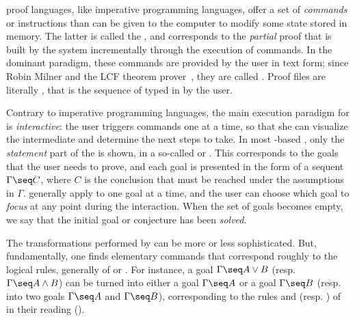 \begin{description}[labelsep=0pt]
  proof languages, like imperative programming languages,
  offer a set of \emph{commands} or instructions than can be given to the
  computer to modify some state stored in memory. The latter is called the
  , and corresponds to the \emph{partial} proof that is built
  by the system incrementally through the execution of commands. In the dominant
  paradigm, these commands are provided by the user in text form; since Robin
  Milner and the LCF theorem prover~, they
  are called . Proof files are literally ,
  that is the sequence of  typed in by the user.
  
  \AP
  Contrary to imperative programming languages, the main execution paradigm for
   is \emph{interactive}: the user triggers commands one at a time,
  so that she can visualize the intermediate  and determine the next
  steps to take. In most -based ,
  only the \emph{statement} part of the  is shown, in a so-called
   or . This corresponds to the goals that the
  user needs to prove, and each goal is presented in the form of a sequent
  $\Gamma \seq C$, where $C$ is the conclusion that must be reached under the
  assumptions in $\Gamma$.  generally apply to one goal at a time, and
  the user can choose which goal to \emph{focus} at any point during the
  interaction. When the set of goals becomes empty, we say that the initial goal
  or conjecture has been \emph{solved}.

  The transformations performed by  can be more or less sophisticated.
  But, fundamentally, one finds elementary commands that correspond roughly to
  the logical rules, generally of  or . For
  instance, a goal $\Gamma\seq A\lor B$ (resp. $\Gamma\seq A\land B$) can be
  turned into either a goal $\Gamma\seq A$ or a goal $\Gamma\seq B$ (resp. into
  two goals $\Gamma\seq A$ and $\Gamma\seq B$), corresponding to the rules
   and  (resp. ) of  in their
   reading ().


\end{description}

